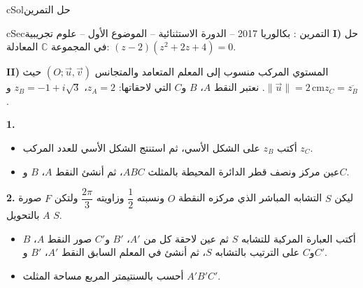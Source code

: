 \documentclass[12pt,a4paper]{article}
\newenvironment{BOX}[2]{\begin{otherlanguage}{english}\begin{arbox}{#1}{#2}}{\end{arbox}\end{otherlanguage}}
\newcounter{exo}
\newenvironment{tamrin}[1]{\stepcounter{exo}\begin{BOX}{cSec}{التمرين \theexo: #1}}{\end{BOX}}
\newenvironment{hal}{\Needspace{12\baselineskip}\begin{otherlanguage}{english}\begin{arbox}[breakable]{cSol}{حل التمرين \theexo}}{\end{arbox}\end{otherlanguage}}
\newenvironment{LTR}{\begin{otherlanguage}{english}}{\end{otherlanguage}}
\newenvironment{sq}{\begin{itemize}[leftmargin=2.4em,itemsep=3pt]}{\end{itemize}}
\newcommand{\qa}{\item[(أ)]}\newcommand{\qb}{\item[(ب)]}\newcommand{\qc}{\item[(جـ)]}\newcommand{\qd}{\item[(د)]}\newcommand{\qe}{\item[(هـ)]}
\newcommand{\QQ}[1]{\par\smallskip\textbf{#1.} }
\begin{document}
\begin{hal}
\begin{center}\begin{LTR}\end{LTR}\end{center}
\end{hal}

\begin{tamrin}{بكالوريا 2017 -- الدورة الاستثنائية -- الموضوع الأول -- علوم تجريبية}
\textbf{I)} حل في المجموعة $\mathbb{C}$ المعادلة: $(z-2)\left(z^2+2z+4\right)=0$.

\textbf{II)} المستوي المركب منسوب إلى المعلم المتعامد والمتجانس $(O;\vec u,\vec v)$ حيث $\|\vec u\|=2\,\text{cm}$.
نعتبر النقط $A$، $B$ و$C$ التي لاحقاتها: $z_A=2$، $z_B=-1+i\sqrt3$ و$z_C=\overline{z_B}$.
\QQ{1}
\begin{sq}
\qa أكتب $z_B$ على الشكل الأسي، ثم استنتج الشكل الأسي للعدد المركب $z_C$.
\qb عين مركز ونصف قطر الدائرة المحيطة بالمثلث $ABC$، ثم أنشئ النقط $A$، $B$ و$C$.
\end{sq}
\QQ{2} ليكن $S$ التشابه المباشر الذي مركزه النقطة $O$ ونسبته $\dfrac12$ وزاويته $\dfrac{2\pi}{3}$ ولتكن $F$ صورة $A$ بالتحويل $S$.
\begin{sq}
\qa أكتب العبارة المركبة للتشابه $S$ ثم عين لاحقة كل من $A'$، $B'$ و$C'$ صور النقط $A$، $B$ و$C$ على الترتيب بالتشابه $S$، ثم أنشئ في المعلم السابق النقط $A'$، $B'$ و$C'$.
\qb أحسب بالسنتيمتر المربع مساحة المثلث $A'B'C'$.
\end{sq}
\end{tamrin}
\end{document}
